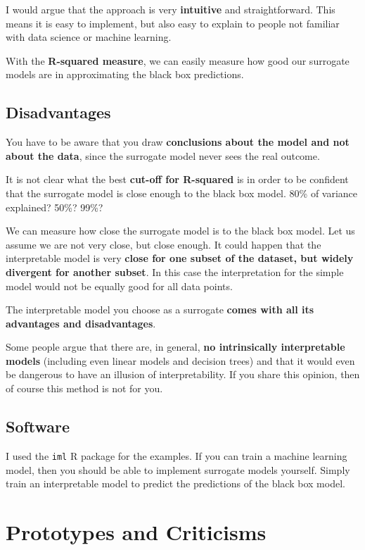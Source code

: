 \documentclass[12pt,]{krantz}
\begin{document}
I would argue that the approach is very \textbf{intuitive} and
straightforward. This means it is easy to implement, but also easy to
explain to people not familiar with data science or machine learning.

With the \textbf{R-squared measure}, we can easily measure how good our
surrogate models are in approximating the black box predictions.

\subsection{Disadvantages}\label{disadvantages-10}

You have to be aware that you draw \textbf{conclusions about the model
and not about the data}, since the surrogate model never sees the real
outcome.

It is not clear what the best \textbf{cut-off for R-squared} is in order
to be confident that the surrogate model is close enough to the black
box model. 80\% of variance explained? 50\%? 99\%?

We can measure how close the surrogate model is to the black box model.
Let us assume we are not very close, but close enough. It could happen
that the interpretable model is very \textbf{close for one subset of the
dataset, but widely divergent for another subset}. In this case the
interpretation for the simple model would not be equally good for all
data points.

The interpretable model you choose as a surrogate \textbf{comes with all
its advantages and disadvantages}.

Some people argue that there are, in general, \textbf{no intrinsically
interpretable models} (including even linear models and decision trees)
and that it would even be dangerous to have an illusion of
interpretability. If you share this opinion, then of course this method
is not for you.

\subsection{Software}\label{software-3}

I used the \texttt{iml} R package for the examples. If you can train a
machine learning model, then you should be able to implement surrogate
models yourself. Simply train an interpretable model to predict the
predictions of the black box model.

\newpage

\hypertarget{proto}{\section{Prototypes and Criticisms}\label{proto}}
\end{document}
